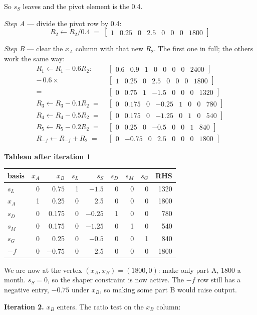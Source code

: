 \documentclass[11pt,a4paper]{article}
\newcommand{\rowv}[1]{\left[\begin{array}{VVVVVVV|V}#1\end{array}\right]}
\newcommand{\piv}[1]{\colorbox{pivot}{$#1$}}   %
\newenvironment{tableau}[1]
  {\begin{center}\begin{minipage}{\linewidth}\centering\small
   \textbf{#1}\\[0.4em]}
  {\end{minipage}\end{center}}
\begin{document}
So $s_S$ leaves and the pivot element is the 0.4.

\emph{Step A} --- divide the pivot row by 0.4:
\[
  R_2 \leftarrow R_2/0.4 \;=\; \rowv{1 & 0.25 & 0 & 2.5 & 0 & 0 & 0 & 1800}
\]

\emph{Step B} --- clear the $x_A$ column with that new $R_2$. The first one in
full; the others work the same way:
\begin{align*}
  R_1 \leftarrow R_1 - 0.6R_2: \quad
  & \rowv{0.6 & 0.9 & 1 & 0 & 0 & 0 & 0 & 2400} \\
  -\,0.6\times & \rowv{1 & 0.25 & 0 & 2.5 & 0 & 0 & 0 & 1800} \\
  = & \rowv{0 & 0.75 & 1 & -1.5 & 0 & 0 & 0 & 1320} \\
  R_3 \leftarrow R_3 - 0.1R_2 \;=\; & \rowv{0 & 0.175 & 0 & -0.25 & 1 & 0 & 0 & 780} \\
  R_4 \leftarrow R_4 - 0.5R_2 \;=\; & \rowv{0 & 0.175 & 0 & -1.25 & 0 & 1 & 0 & 540} \\
  R_5 \leftarrow R_5 - 0.2R_2 \;=\; & \rowv{0 & 0.25 & 0 & -0.5 & 0 & 0 & 1 & 840} \\
  R_{-f} \leftarrow R_{-f} + R_2 \;=\; & \rowv{0 & -0.75 & 0 & 2.5 & 0 & 0 & 0 & 1800}
\end{align*}

\begin{tableau}{Tableau after iteration 1}
\begin{tabular}{l|rrrrrrr|r}
basis & $x_A$ & $x_B$ & $s_L$ & $s_S$ & $s_D$ & $s_M$ & $s_G$ & RHS \\
\hline
$s_L$ & 0 & \piv{0.75} & 1 & $-1.5$  & 0 & 0 & 0 & 1320 \\
$x_A$ & 1 & 0.25  & 0 & 2.5     & 0 & 0 & 0 & 1800 \\
$s_D$ & 0 & 0.175 & 0 & $-0.25$ & 1 & 0 & 0 & 780 \\
$s_M$ & 0 & 0.175 & 0 & $-1.25$ & 0 & 1 & 0 & 540 \\
$s_G$ & 0 & 0.25  & 0 & $-0.5$  & 0 & 0 & 1 & 840 \\
\hline
$-f$  & 0 & $-0.75$ & 0 & 2.5 & 0 & 0 & 0 & 1800 \\
\end{tabular}
\end{tableau}

We are now at the vertex $(x_A, x_B) = (1800, 0)$: make only part A, 1800 a
month. $s_S = 0$, so the shaper constraint is now active. The $-f$ row still has
a negative entry, $-0.75$ under $x_B$, so making some part B would raise output.

\textbf{Iteration 2.} $x_B$ enters. The ratio test on the $x_B$ column:
\end{document}
